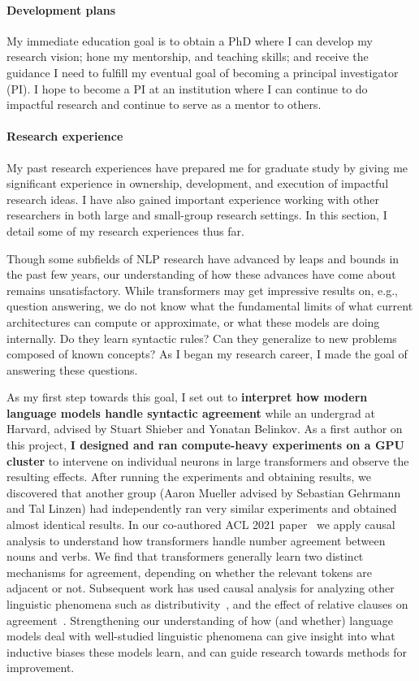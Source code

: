 \documentclass[11pt]{article}
\begin{document}
\paragraph{Development plans}

My immediate education goal is to obtain a PhD 
where I can develop my research vision;
hone my mentorship, and teaching skills;
and receive the guidance I need 
to fulfill my eventual goal of becoming a principal investigator (PI). 
I hope to become a PI at an institution where I can continue to do impactful research
and continue to serve as a mentor to others.

\paragraph{Research experience}

My past research experiences have prepared me for graduate study
by giving me significant experience in ownership, development, and execution
of impactful research ideas. 
I have also gained important experience working with other researchers in both
large and small-group research settings. 
In this section, I detail some of my research experiences thus far.

Though some subfields of NLP research 
have advanced by leaps and bounds in the past few years,
our understanding of how these advances 
have come about remains unsatisfactory.
While transformers may get impressive results on, e.g., question answering,
we do not know what the fundamental limits 
of what current architectures can compute or approximate,
or what these models are doing internally.
Do they learn syntactic rules? 
Can they generalize to new problems composed of known concepts?
As I began my research career, I made the goal of answering these questions.

As my first step towards this goal, 
I set out to \textbf{interpret how modern language models handle syntactic agreement}
while an undergrad at Harvard, advised by Stuart Shieber and Yonatan Belinkov.
As a first author on this project, 
\textbf{I designed and ran compute-heavy experiments on a GPU cluster}
to intervene on individual neurons in large transformers 
and observe the resulting effects.
After running the experiments and obtaining results,
we discovered that another group 
(Aaron Mueller advised by Sebastian Gehrmann and Tal Linzen)
had independently ran very similar experiments and obtained almost identical results.
In our co-authored ACL 2021 paper~\cite{Finlayson2021CausalAO} 
we apply causal analysis to understand 
how transformers handle number agreement between nouns and verbs. 
We find that transformers generally learn two distinct mechanisms
for agreement, depending on whether the relevant tokens are adjacent or not.
Subsequent work has used causal analysis 
for analyzing other linguistic phenomena 
such as distributivity~\cite{Ban2022TestingPL},
and the effect of relative clauses on agreement~\cite{Ravfogel2021CounterfactualIR}.
Strengthening our understanding of how 
(and whether) 
language models deal with well-studied linguistic phenomena
can give insight into what inductive biases these models learn, 
and can guide research towards methods for improvement.
\end{document}
